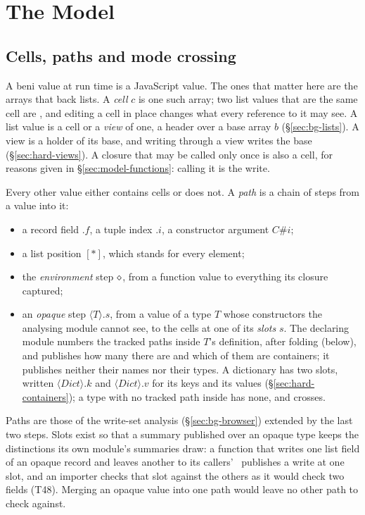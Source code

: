 \chapter{The Model}
\label{sec:model}

\section{Cells, paths and mode crossing}
\label{sec:model-cells}

A beni value at run time is a JavaScript value. The ones that matter here are the arrays that back
lists. A \emph{cell} $c$ is one such array; two list values that are the same cell are \code{===},
and editing a cell in place changes what every reference to it may see. A list value is a cell or a
\emph{view} of one, a header  over a base array $b$
(\S\ref{sec:bg-lists}). A view is a holder of its base, and writing through a view writes the base
(\S\ref{sec:hard-views}). A closure that may be called only once is also a cell, for reasons given in
\S\ref{sec:model-functions}: calling it is the write.

Every other value either contains cells or does not. A \emph{path} is a chain of steps from a value
into it:
\begin{itemize}
\item a record field $.f$, a tuple index $.i$, a constructor argument $C\#i$;
\item a list position $[\ast]$, which stands for every element;
\item the \emph{environment} step $\diamond$, from a function value to everything its closure captured;
\item an \emph{opaque} step $\langle T\rangle.s$, from a value of a type $T$ whose constructors the
analysing module cannot see, to the cells at one of its \emph{slots} $s$. The declaring module numbers
the tracked paths inside $T$'s definition, after folding (below), and publishes how many there are and
which of them are containers; it publishes neither their names nor their types. A dictionary has two
slots, written $\langle\mathit{Dict}\rangle.k$ and $\langle\mathit{Dict}\rangle.v$ for its keys and its
values (\S\ref{sec:hard-containers}); a type with no tracked path inside has none, and crosses.
\end{itemize}
Paths are those of the write-set analysis (\S\ref{sec:bg-browser}) extended by the last two steps.
Slots exist so that a summary published over an opaque type keeps the distinctions its own module's
summaries draw: a function that writes one list field of an opaque record and leaves another to its
callers' \Disjoint\ publishes a write at one slot, and an importer checks that slot against the others
as it would check two fields (T48). Merging an opaque value into one path would leave no other path to
check against.

